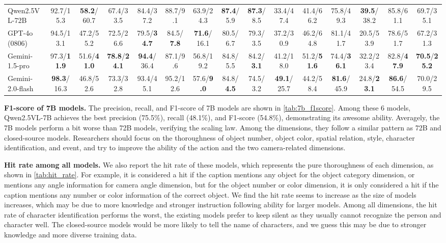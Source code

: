 \begin{table*}[!t]
{\begin{tabular}{@{}lcccccccccccccc@{}}
Qwen2.5VL-72B & 92.7/15.3 & \textbf{58.2}/60.7 & 67.4/33.5 & 84.4/37.2 & 88.7/9.1 & 63.9/24.3 & \textbf{87.4}/5.9 & \textbf{87.3}/8.5 & 33.4/47.4 & 41.4/66.2 & 75.8/49.3 & \textbf{39.5}/38.2 & 85.8/61.1 & 69.7/35.1 \\
GPT-4o (0806) & 94.5/13.1 & 47.2/55.2 & 72.5/26.6 & 79.5/\textbf{34.7} & 84.5/\textbf{7.8} & \textbf{71.6}/16.1 & 80.5/6.7 & 79.3/3.5 & 37.2/30.9 & 46.2/64.8 & 81.1/41.7 & 20.5/53.9 & 78.6/51.7 & 67.2/31.3 \\
Gemini-1.5-pro & 97.3/\textbf{11.9} & 51.6/\textbf{41.0} & \textbf{78.8}/\textbf{24.1} & \textbf{94.4}/36.4 & 87.1/9.6 & 56.8/19.2 & 84.8/5.5 & 84.2/\textbf{3.1} & 41.2/18.0 & 51.2/\textbf{51.6} & 74.4/\textbf{36.1} & 32.2/23.4 & 82.8/\textbf{47.9} & \textbf{70.5}/\textbf{25.2} \\ 
Gemini-2.0-flash & \textbf{98.3}/16.3 & 46.8/52.6 & 73.3/32.8 & 93.4/45.1 & 95.2/12.6 & 57.6/\textbf{9.0} & 84.8/\textbf{4.5} & 74.5/3.2 & \textbf{49.1}/25.7 & 44.2/58.4 & \textbf{81.6}/45.9 & 24.8/\textbf{23.1} & \textbf{86.6}/54.5 & 70.0/29.5 \\ \bottomrule
\end{tabular}%
}
\end{table*}


\noindent\textbf{F1-score of 7B models.}
The precision, recall, and F1-score of 7B models are shown in \cref{tab:7b_f1score}. Among these 6 models, Qwen2.5VL-7B achieves the best precision (75.5\%), recall (48.1\%), and F1-score (54.8\%), demonstrating its awesome ability. Averagely, the 7B models perform a bit worse than 72B models, verifying the scaling law. Among the dimensions, they follow a similar pattern as 72B and closed-source models. Researchers should focus on the thoroughness of object number, object color, spatial relation, style, character identification, and event, and try to improve the ability of the action and the two camera-related dimensions.

\noindent\textbf{Hit rate among all models.}
We also report the hit rate of these models, which represents the pure thoroughness of each dimension, as shown in \cref{tab:hit_rate}. For example, it is considered a hit if the caption mentions any object for the object category dimension, or mentions any angle information for camera angle dimension, but for the object number or color dimension, it is only considered a hit if the caption mentions any number or color information of the correct object. We find the hit rate seems to increase as the size of models increases, which may be due to more knowledge and stronger instruction following ability for larger models. Among all dimensions, the hit rate of character identification performs the worst, the existing models prefer to keep silent as they usually cannot recognize the person and character well. The closed-source models would be more likely to tell the name of characters, and we guess this may be due to stronger knowledge and more diverse training data.

